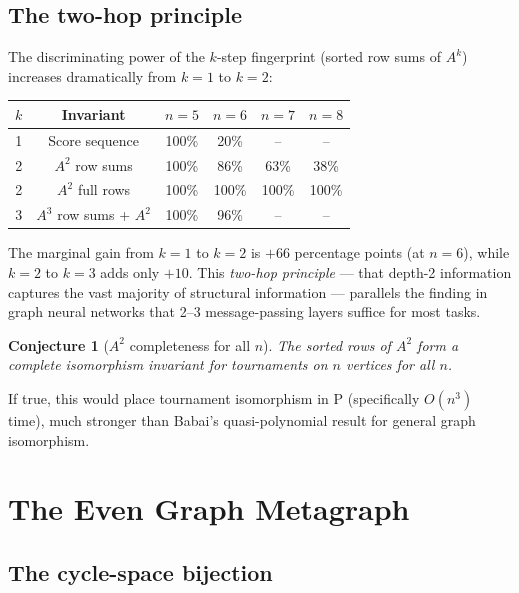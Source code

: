 \documentclass[11pt,a4paper]{article}
\newtheorem{conjecture}[theorem]{Conjecture}
\theoremstyle{definition}
\theoremstyle{remark}
\begin{document}
\subsection{The two-hop principle}

The discriminating power of the $k$-step fingerprint (sorted row sums of $A^k$) increases dramatically from $k=1$ to $k=2$:

\begin{center}
\begin{tabular}{c c c c c c}
\toprule
$k$ & Invariant & $n=5$ & $n=6$ & $n=7$ & $n=8$ \\
\midrule
1 & Score sequence & 100\% & 20\% & -- & -- \\
2 & $A^2$ row sums & 100\% & 86\% & 63\% & 38\% \\
2 & $A^2$ full rows & 100\% & 100\% & 100\% & 100\% \\
3 & $A^3$ row sums + $A^2$ & 100\% & 96\% & -- & -- \\
\bottomrule
\end{tabular}
\end{center}

\noindent The marginal gain from $k=1$ to $k=2$ is $+66$ percentage points (at $n=6$), while $k=2$ to $k=3$ adds only $+10$. This \emph{two-hop principle} --- that depth-2 information captures the vast majority of structural information --- parallels the finding in graph neural networks that 2--3 message-passing layers suffice for most tasks.

\begin{conjecture}[$A^2$ completeness for all $n$]
The sorted rows of $A^2$ form a complete isomorphism invariant for tournaments on $n$ vertices for all $n$.
\end{conjecture}

If true, this would place tournament isomorphism in $\mathrm{P}$ (specifically $O(n^3)$ time), much stronger than Babai's quasi-polynomial result for general graph isomorphism.

\section{The Even Graph Metagraph}
\label{sec:evengraph}

\subsection{The cycle-space bijection}
\end{document}
